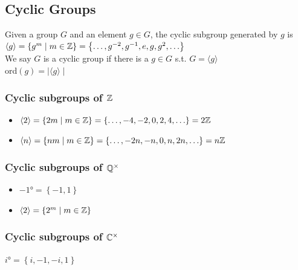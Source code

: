 \subsection{Cyclic Groups}

\begin{definition}
    Given a group $G$ and an element $g \in G$, the cyclic
    subgroup generated by $g$ is \(\langle g \rangle= \left\{ g^m \mid m \in\mathbb{Z} \right\}
    = \left\{ \ldots, g^{-2}, g^{-1}, e, g, g^2, \ldots \right\}\)\\
    We say $G$ is a cyclic group if there is a $g\in G$ s.t. $G=\langle g \rangle$\\
    ord$(g)=\mid\langle g \rangle \mid$
\end{definition}

\subsubsection*{Cyclic subgroups of $\mathbb{Z}$}
\begin{example}
    \phantom{text}

    \begin{itemize}
        \item $\left\langle 2 \right\rangle= \left\{ 2m \mid m \in\mathbb{Z} \right\}
        = \left\{ \ldots, -4, -2, 0, 2, 4, \ldots \right\}
        = 2\mathbb{Z}$
        \item $\left\langle n \right\rangle= \left\{ nm \mid m \in\mathbb{Z} \right\}
        = \left\{ \ldots, -2n, -n, 0, n, 2n, \ldots \right\}
        = n\mathbb{Z}$
    \end{itemize}
\end{example}
\subsubsection*{Cyclic subgroups of $\mathbb{Q}^{\times}$}
\begin{example}
    \phantom{text}

    \begin{itemize}
        \item $\ang{-1}=\left\{ -1,1 \right\}$
        \item $\left\langle 2 \right\rangle=\left\{ 2^m \mid m\in\mathbb{Z} \right\}$
    \end{itemize}
\end{example}

\subsubsection*{Cyclic subgroups of $\mathbb{C}^{\times}$}
\begin{example}
    \phantom{text}

    $\ang{i}=\left\{ i,-1,-i,1 \right\}$
\end{example}

